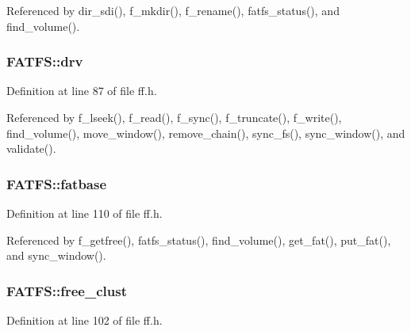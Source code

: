 Referenced by dir\+\_\+sdi(), f\+\_\+mkdir(), f\+\_\+rename(), fatfs\+\_\+status(), and find\+\_\+volume().

\subsubsection[{\texorpdfstring{drv}{drv}}]{ F\+A\+T\+F\+S\+::drv}\hypertarget{structFATFS_a6a791560e2687e8b1569bfce61208d2d}{}\label{structFATFS_a6a791560e2687e8b1569bfce61208d2d}


Definition at line 87 of file ff.\+h.



Referenced by f\+\_\+lseek(), f\+\_\+read(), f\+\_\+sync(), f\+\_\+truncate(), f\+\_\+write(), find\+\_\+volume(), move\+\_\+window(), remove\+\_\+chain(), sync\+\_\+fs(), sync\+\_\+window(), and validate().

\subsubsection[{\texorpdfstring{fatbase}{fatbase}}]{ F\+A\+T\+F\+S\+::fatbase}\hypertarget{structFATFS_a848fba02c4aabe02ef2984e578f33d64}{}\label{structFATFS_a848fba02c4aabe02ef2984e578f33d64}


Definition at line 110 of file ff.\+h.



Referenced by f\+\_\+getfree(), fatfs\+\_\+status(), find\+\_\+volume(), get\+\_\+fat(), put\+\_\+fat(), and sync\+\_\+window().

\subsubsection[{\texorpdfstring{free\+\_\+clust}{free_clust}}]{ F\+A\+T\+F\+S\+::free\+\_\+clust}\hypertarget{structFATFS_a5fb49e6ac511bd97eaffdd636d0e4165}{}\label{structFATFS_a5fb49e6ac511bd97eaffdd636d0e4165}


Definition at line 102 of file ff.\+h.



